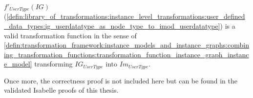 \begin{thm}
\label{defin:library_of_transformations:instance_level_transformations:user_defined_data_types:ig_userdatatype_as_node_type_to_imod_userdatatype_func}
$f'_{UserType}(IG)$ (\cref{defin:library_of_transformations:instance_level_transformations:user_defined_data_types:ig_userdatatype_as_node_type_to_imod_userdatatype}) is a valid transformation function in the sense of \cref{defin:transformation_framework:instance_models_and_instance_graphs:combining_transformation_functions:transformation_function_instance_graph_instance_model} transforming $IG_{UserType}$ into $Im_{UserType}$.
\end{thm}

Once more, the correctness proof is not included here but can be found in the validated Isabelle proofs of this thesis.